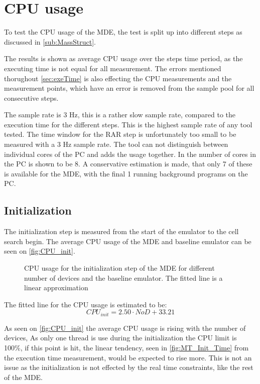 \section{CPU usage}
To test the CPU usage of the MDE, the test is split up into different steps as discussed in \autoref{sub:MassStruct}. 

The results is shown as average CPU usage over the steps time period, as the executing time is not equal for all measurement. The errors mentioned thorughout \autoref{sec:exeTime} is also effecting the CPU measurements and the measurement points, which have an error is removed from the sample pool for all consecutive steps.

The sample rate is 3 Hz, this is a rather slow sample rate, compared to the execution time for the different steps. This is the highest sample rate of any tool tested. The time window for the RAR step is unfortunately too small to be measured with a 3 Hz sample rate. The tool can not distinguish between individual cores of the PC and adds the usage together. In  the number of cores in the PC is shown to be 8. A conservative estimation is made, that only 7 of these is available for the MDE, with the final 1 running background programs on the PC. 

\subsection{Initialization}
The initialization step is measured from the start of the emulator to the cell search begin. The average CPU usage of the MDE and baseline emulator can be seen on \autoref{fig:CPU_init}.

\begin{figure}[H]
\centering
\resizebox{0.5\textwidth}{!}{
}
\caption{CPU usage for the initialization step of the MDE for different number of devices and the baseline emulator. The fitted line is a linear approximation}
\label{fig:CPU_init}
\end{figure}

The fitted line for the CPU usage is estimated to be:
\begin{equation}
CPU_{init} = 2.50 \cdot NoD + 33.21
\end{equation}

As seen on \autoref{fig:CPU_init} the average CPU usage is rising with the number of devices, As only one thread is use during the initialization the CPU limit is 100\%, if this point is hit, the linear tendency, seen in \autoref{fig:MT_Init_Time} from the execution time measurement, would be expected to rise more. This is not an issue as the initialization is not effected by the real time constraints, like the rest of the MDE.

